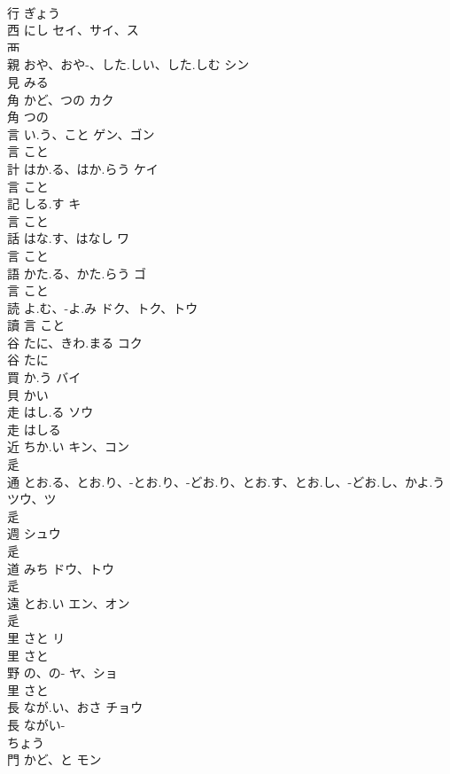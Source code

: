 \documentclass[8pt]{extreport}
\begin{document}
\begin{CJK}{UTF8}{min}
\\	行		ぎょう		
\\	西	にし	セイ、サイ、ス	
\\	襾				
\\	親	おや、おや-、した.しい、した.しむ	シン	
\\	見		みる		
\\	角	かど、つの	カク	
\\	角		つの		
\\	言	い.う、こと	ゲン、ゴン	
\\	言		こと		
\\	計	はか.る、はか.らう	ケイ	
\\	言		こと		
\\	記	しる.す	キ	
\\	言		こと		
\\	話	はな.す、はなし	ワ	
\\	言		こと		
\\	語	かた.る、かた.らう	ゴ	
\\	言		こと		
\\	読	よ.む、-よ.み	ドク、トク、トウ	
\\	讀	言		こと		
\\	谷	たに、きわ.まる	コク	
\\	谷		たに		
\\	買	か.う	バイ	
\\	貝		かい		
\\	走	はし.る	ソウ	
\\	走		はしる		
\\	近	ちか.い	キン、コン	
\\	辵				
\\	通	とお.る、とお.り、-とお.り、-どお.り、とお.す、とお.し、-どお.し、かよ.う	ツウ、ツ	
\\	辵				
\\	週		シュウ	
\\	辵				
\\	道	みち	ドウ、トウ	
\\	辵				
\\	遠	とお.い	エン、オン	
\\	辵				
\\	里	さと	リ	
\\	里		さと		
\\	野	の、の-	ヤ、ショ	
\\	里		さと		
\\	長	なが.い、おさ	チョウ	
\\	長		ながい-
\\	ちょう		
\\	門	かど、と	モン	

\end{CJK}
\end{document}
